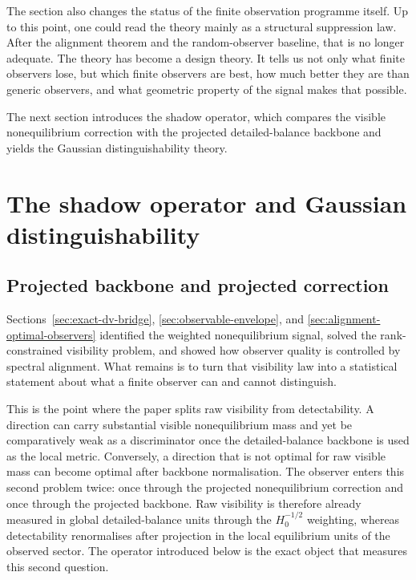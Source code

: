 \documentclass[11pt,a4paper]{article}
\numberwithin{equation}{section}
\theoremstyle{thmcompact}
\theoremstyle{remark}
\begin{document}
The section also changes the status of the finite observation programme itself. Up to this point, one could read the theory mainly as a structural suppression law. After the alignment theorem and the random-observer baseline, that is no longer adequate. The theory has become a design theory. It tells us not only what finite observers lose, but which finite observers are best, how much better they are than generic observers, and what geometric property of the signal makes that possible.

The next section introduces the shadow operator, which compares the visible nonequilibrium correction with the projected detailed-balance backbone and yields the Gaussian distinguishability theory.

\section{The shadow operator and Gaussian distinguishability}
\label{sec:shadow-operator-gaussian-distinguishability}

\subsection{Projected backbone and projected correction}

Sections~\ref{sec:exact-dv-bridge}, \ref{sec:observable-envelope}, and \ref{sec:alignment-optimal-observers} identified the weighted nonequilibrium signal, solved the rank-constrained visibility problem, and showed how observer quality is controlled by spectral alignment. What remains is to turn that visibility law into a statistical statement about what a finite observer can and cannot distinguish.

This is the point where the paper splits raw visibility from detectability. A direction can carry substantial visible nonequilibrium mass and yet be comparatively weak as a discriminator once the detailed-balance backbone is used as the local metric. Conversely, a direction that is not optimal for raw visible mass can become optimal after backbone normalisation. The observer enters this second problem twice: once through the projected nonequilibrium correction and once through the projected backbone. Raw visibility is therefore already measured in global detailed-balance units through the \(H_0^{-1/2}\) weighting, whereas detectability renormalises after projection in the local equilibrium units of the observed sector. The operator introduced below is the exact object that measures this second question.
\end{document}
